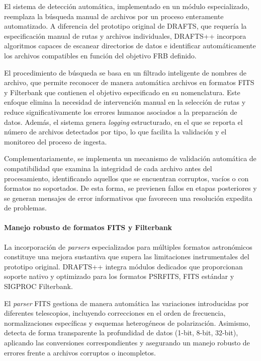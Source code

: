 El sistema de detección automática, implementado en un módulo especializado, reemplaza la búsqueda manual de archivos por un proceso enteramente automatizado. A diferencia del prototipo original de DRAFTS, que requería la especificación manual de rutas y archivos individuales, DRAFTS++ incorpora algoritmos capaces de escanear directorios de datos e identificar automáticamente los archivos compatibles en función del objetivo FRB definido.

El procedimiento de búsqueda se basa en un filtrado inteligente de nombres de archivo, que permite reconocer de manera automática archivos en formatos FITS y Filterbank que contienen el objetivo especificado en su nomenclatura. Este enfoque elimina la necesidad de intervención manual en la selección de rutas y reduce significativamente los errores humanos asociados a la preparación de datos. Además, el sistema genera \textit{logging} estructurado, en el que se reporta el número de archivos detectados por tipo, lo que facilita la validación y el monitoreo del proceso de ingesta.

Complementariamente, se implementa un mecanismo de validación automática de compatibilidad que examina la integridad de cada archivo antes del procesamiento, identificando aquellos que se encuentran corruptos, vacíos o con formatos no soportados. De esta forma, se previenen fallos en etapas posteriores y se generan mensajes de error informativos que favorecen una resolución expedita de problemas.


\paragraph{Manejo robusto de formatos FITS y Filterbank}

La incorporación de \textit{parsers} especializados para múltiples formatos astronómicos constituye una mejora sustantiva que supera las limitaciones instrumentales del prototipo original. DRAFTS++ integra módulos dedicados que proporcionan soporte nativo y optimizado para los formatos PSRFITS, FITS estándar y SIGPROC Filterbank.  

El \textit{parser} FITS gestiona de manera automática las variaciones introducidas por diferentes telescopios, incluyendo correcciones en el orden de frecuencia, normalizaciones específicas y esquemas heterogéneos de polarización. Asimismo, detecta de forma transparente la profundidad de datos (1-bit, 8-bit, 32-bit), aplicando las conversiones correspondientes y asegurando un manejo robusto de errores frente a archivos corruptos o incompletos.  

